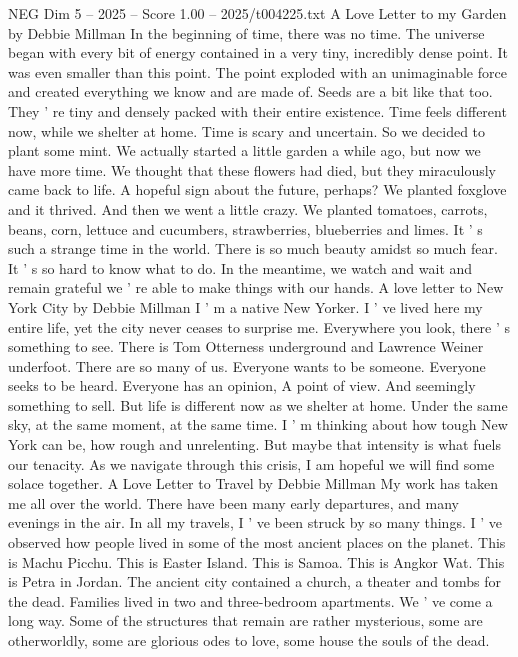 \begin{textsample}{NEG Dim 5 – 2025 – Score 1.00 – 2025/t004225.txt}  \label{ex:f5_neg_003}
A Love Letter to my Garden by Debbie Millman In the beginning of time, there was no time.
The universe began with every bit of energy contained in a very tiny, incredibly dense point.
It was even smaller than this point.
The point exploded with an unimaginable force and created everything we know and are made of.
Seeds are a bit like that too.
They ' re tiny and densely packed with their entire existence.
Time feels different now, while we shelter at home.
Time is scary and uncertain.
So we decided to plant some mint.
We actually started a little garden a while ago, but now we have more time.
We thought that these flowers had died, but they miraculously came back to life.
A hopeful sign about the future, perhaps?
We planted foxglove and it thrived.
And then we went a little crazy.
We planted tomatoes, carrots, beans, corn, lettuce and cucumbers, strawberries, blueberries and limes.
It ' s such a strange time in the world.
There is so much beauty amidst so much fear.
It ' s so hard to know what to do.
In the meantime, we watch and wait and remain grateful we ' re able to make things with our hands.
A love letter to New York City by Debbie Millman I ' m a native New Yorker.
I ' ve lived here my entire life, yet the city never ceases to surprise me.
Everywhere you look, there ' s something to see.
There is Tom Otterness underground and Lawrence Weiner underfoot.
There are so many of us.
Everyone wants to be someone.
Everyone seeks to be heard.
Everyone has an opinion, A point of view.
And seemingly something to sell.
But life is different now as we shelter at home.
Under the same sky, at the same moment, at the same time.
I ' m thinking about how tough New York can be, how rough and unrelenting.
But maybe that intensity is what fuels our tenacity.
As we navigate through this crisis, I am hopeful we will find some solace together.
A Love Letter to Travel by Debbie Millman My work has taken me all over the world.
There have been many early departures, and many evenings in the air.
In all my travels, I ' ve been struck by so many things.
I ' ve observed how people lived in some of the most ancient places on the planet.
This is Machu Picchu.
This is Easter Island.
This is Samoa.
This is Angkor Wat.
This is Petra in Jordan.
The ancient city contained a church, a theater and tombs for the dead.
Families lived in two and three-bedroom apartments.
We ' ve come a long way.
Some of the structures that remain are rather mysterious, some are otherworldly, some are glorious odes to love, some house the souls of the dead.

\end{textsample}
